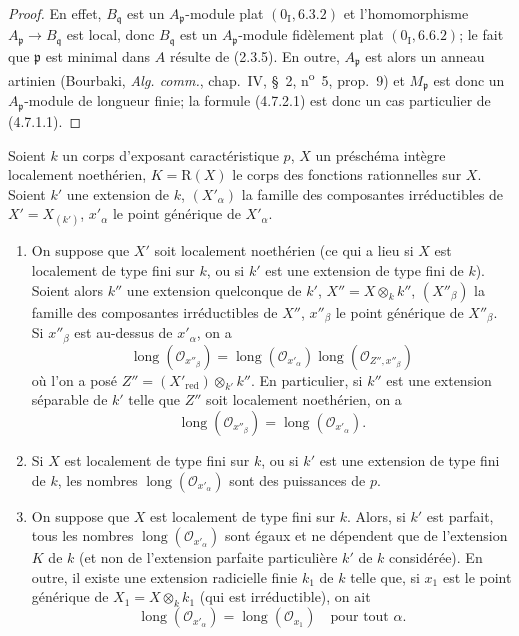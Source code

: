 \begin{proof}
En effet, $B_{\mathfrak q}$ est un $A_{\mathfrak p}$-module plat
$(0_{\mathrm I},6.3.2)$ et l'homomorphisme
$A_{\mathfrak p}\to B_{\mathfrak q}$ est local, donc $B_{\mathfrak q}$ est
un $A_{\mathfrak p}$-module fidèlement plat $(0_{\mathrm I},6.6.2)$; le fait
que $\mathfrak p$ est minimal dans $A$ résulte de (2.3.5). En outre,
$A_{\mathfrak p}$ est alors un anneau artinien (Bourbaki, \emph{Alg. comm.},
chap.~IV, \S~2, n\textsuperscript{o}~5, prop.~9) et $M_{\mathfrak p}$ est donc
un $A_{\mathfrak p}$-module de longueur finie; la formule (4.7.2.1) est donc
un cas particulier de (4.7.1.1).
\end{proof}

\begin{proposition}[4.7.3]
\label{IV.2.4.7.3-fr}
Soient $k$ un corps d'exposant caractéristique $p$, $X$ un préschéma intègre
localement noethérien, $K=\mathrm R(X)$ le corps des fonctions rationnelles
sur $X$. Soient $k'$ une extension de $k$, $(X'_\alpha)$ la famille des
composantes irréductibles de $X'=X_{(k')}$, $x'_\alpha$ le point générique de
$X'_\alpha$.
\begin{enumerate}
\item[(i)] On suppose que $X'$ soit localement noethérien (ce qui a lieu si
$X$ est localement de type fini sur $k$, ou si $k'$ est une extension de type
fini de $k$). Soient alors $k''$ une extension quelconque de $k'$,
$X''=X\otimes_k k''$, $(X''_\beta)$ la famille des composantes irréductibles
de $X''$, $x''_\beta$ le point générique de $X''_\beta$. Si $x''_\beta$ est
au-dessus de $x'_\alpha$, on a
\begin{equation}
\operatorname{long}(\mathcal O_{x''_\beta})
=\operatorname{long}(\mathcal O_{x'_\alpha})
 \operatorname{long}(\mathcal O_{Z'',x''_\beta})
\tag{4.7.3.1}
\label{IV.2.4.7.3.1-fr}
\end{equation}
où l'on a posé $Z''=(X'_{\mathrm{red}})\otimes_{k'}k''$. En particulier, si
$k''$ est une extension séparable de $k'$ telle que $Z''$ soit localement
noethérien, on a
\[
\operatorname{long}(\mathcal O_{x''_\beta})
=\operatorname{long}(\mathcal O_{x'_\alpha}).
\]


\item[(ii)] Si $X$ est localement de type fini sur $k$, ou si $k'$ est une
extension de type fini de $k$, les nombres
$\operatorname{long}(\mathcal O_{x'_\alpha})$ sont des puissances de $p$.

\item[(iii)] On suppose que $X$ est localement de type fini sur $k$. Alors,
si $k'$ est parfait, tous les nombres
$\operatorname{long}(\mathcal O_{x'_\alpha})$ sont égaux et ne dépendent que
de l'extension $K$ de $k$ (et non de l'extension parfaite particulière $k'$
de $k$ considérée). En outre, il existe une extension radicielle finie $k_1$
de $k$ telle que, si $x_1$ est le point générique de
$X_1=X\otimes_k k_1$ (qui est irréductible), on ait
\[
\operatorname{long}(\mathcal O_{x'_\alpha})
=\operatorname{long}(\mathcal O_{x_1})
\quad\text{pour tout }\alpha.
\]
\end{enumerate}
\end{proposition}

